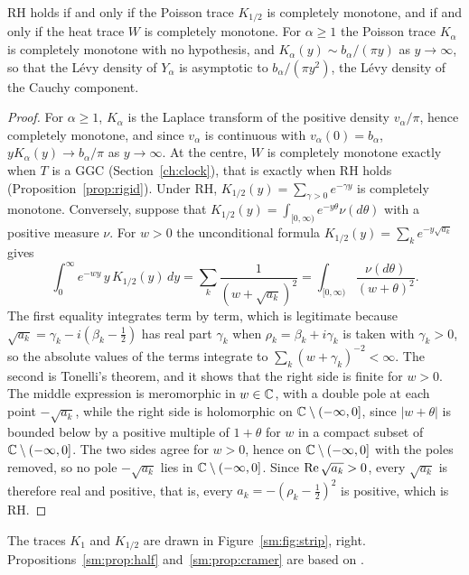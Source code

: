 \begin{corollary}\label{sm:cor:poisson}
RH holds if and only if the Poisson trace $K_{1/2}$ is completely monotone, and if and only if the heat trace $W$ is completely monotone. For $\alpha\ge1$ the Poisson trace $K_\alpha$ is completely monotone with no hypothesis, and $K_\alpha(y)\sim b_\alpha/(\pi y)$ as $y\to\infty$, so that the L\'evy density of $Y_\alpha$ is asymptotic to $b_\alpha/(\pi y^2)$, the L\'evy density of the Cauchy component.
\end{corollary}

\begin{proof}
For $\alpha\ge1$, $K_\alpha$ is the Laplace transform of the positive density $v_\alpha/\pi$, hence completely monotone, and since $v_\alpha$ is continuous with $v_\alpha(0)=b_\alpha$, $yK_\alpha(y)\to b_\alpha/\pi$ as $y\to\infty$. At the centre, $W$ is completely monotone exactly when $T$ is a GGC (Section~\ref{ch:clock}), that is exactly when RH holds (Proposition~\ref{prop:rigid}). Under RH, $K_{1/2}(y)=\sum_{\gamma>0}e^{-\gamma y}$ is completely monotone. Conversely, suppose that $K_{1/2}(y)=\int_{[0,\infty)}e^{-y\theta}\nu(d\theta)$ with a positive measure $\nu$. For $w>0$ the unconditional formula $K_{1/2}(y)=\sum_ke^{-y\sqrt{a_k}}$ gives
\[
\int_0^\infty e^{-wy}\,y\,K_{1/2}(y)\,dy=\sum_k\frac1{(w+\sqrt{a_k})^2}=\int_{[0,\infty)}\frac{\nu(d\theta)}{(w+\theta)^2}.
\]
The first equality integrates term by term, which is legitimate because $\sqrt{a_k}=\gamma_k-i(\beta_k-\frac12)$ has real part $\gamma_k$ when $\rho_k=\beta_k+i\gamma_k$ is taken with $\gamma_k>0$, so the absolute values of the terms integrate to $\sum_k(w+\gamma_k)^{-2}<\infty$. The second is Tonelli's theorem, and it shows that the right side is finite for $w>0$. The middle expression is meromorphic in $w\in\mathbb{C}$, with a double pole at each point $-\sqrt{a_k}$, while the right side is holomorphic on $\mathbb{C}\setminus(-\infty,0]$, since $|w+\theta|$ is bounded below by a positive multiple of $1+\theta$ for $w$ in a compact subset of $\mathbb{C}\setminus(-\infty,0]$. The two sides agree for $w>0$, hence on $\mathbb{C}\setminus(-\infty,0]$ with the poles removed, so no pole $-\sqrt{a_k}$ lies in $\mathbb{C}\setminus(-\infty,0]$. Since $\operatorname{Re}\sqrt{a_k}>0$, every $\sqrt{a_k}$ is therefore real and positive, that is, every $a_k=-(\rho_k-\frac12)^2$ is positive, which is RH.
\end{proof}

The traces $K_1$ and $K_{1/2}$ are drawn in Figure~\ref{sm:fig:strip}, right. Propositions~\ref{sm:prop:half} and~\ref{sm:prop:cramer} are based on \cite{P26heat}.

